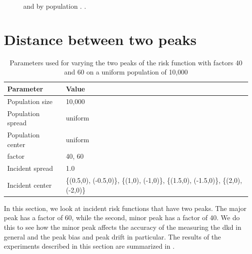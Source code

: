 \begin{figure}[htbp]
\begin{subfigure}[t]{0.49\textwidth}
        \label{fig:other_measures:pop_spread:maxerr}
    \end{subfigure}
    \caption{ and  by population . \errorplotcaption.}
    \label{fig:other_measures:pop_spread}
\end{figure}

\section{Distance between two peaks}
\label{sec:results:p1.4_100_G}

\begin{table}[htbp]
    \centering
    \begin{tabular}{ll}
        \toprule
        Parameter & Value \\
        \midrule
        Population size & 10,000 \\
        Population \gls{spread} & uniform \\
        Population center & uniform \\
        \Gls{factor} & 40, 60 \\
        Incident \gls{spread} & 1.0 \\
        Incident center & \{(0.5,0), (-0.5,0)\},  \{(1,0), (-1,0)\}, \{(1.5,0), (-1.5,0)\}, \{(2,0), (-2,0)\}\\
        \bottomrule
    \end{tabular}
    \caption{Parameters used for varying the two peaks of the risk function with \glspl{factor} 40 and 60 on a uniform population of 10,000}
    \label{tab:params:p1.4_100_G}
\end{table}

In this section, we look at incident risk functions that have two peaks.
The major peak has a \gls{factor} of 60, while the second, minor peak has a \gls{factor} of 40.
We do this to see how the minor peak affects the accuracy of the measuring the \gls{dkd} in general and the \gls{peak bias} and \gls{peak drift} in particular.
The results of the experiments described in this section are summarized in .

